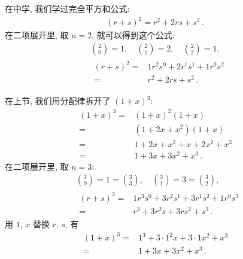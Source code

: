 \begin{example}
    在中学, 我们学过完全平方和公式:
    \begin{align*}
        (r + s)^2 = r^2 + 2rs + s^2 \period
    \end{align*}
    在二项展开里, 取 $n = 2$, 就可以得到这个公式:
    \begin{align*}
         & \binom{2}{0} = 1, \quad \binom{2}{1} = 2, \quad \binom{2}{2} = 1, \\
         & \begin{aligned}
            (r + s)^2
            = {} & 1r^2 s^0 + 2r^1 s^1 + 1r^0 s^2 \\
            = {} & r^2 + 2rs + s^2 \period
        \end{aligned}
    \end{align*}

    在上节, 我们用分配律拆开了 $(1+x)^3$:
    \begin{align*}
        (1+x)^3
        = {} & (1+x)^2 (1+x)         \\
        = {} & (1+2x+x^2) (1+x)      \\
        = {} & 1+2x+x^2 + x+2x^2+x^3 \\
        = {} & 1+3x+3x^2+x^3 \period
    \end{align*}
    在二项展开里, 取 $n = 3$:
    \begin{align*}
         & \binom{3}{0} = 1 = \binom{3}{3}, \quad \binom{3}{1} = 3 = \binom{3}{2}, \\
         & \begin{aligned}
            (r+s)^3
            = {} & 1r^3 s^0 + 3r^2 s^1 + 3r^1 s^2 + 1r^0 s^3 \\
            = {} & r^3 + 3r^2 s + 3r s^2 + s^3 \period
        \end{aligned}
    \end{align*}
    用 $1$, $x$ 替换 $r$, $s$, 有
    \begin{align*}
        (1+x)^3
        = {} & 1^3 + 3 \cdot 1^2 x + 3 \cdot 1 x^2 + x^3 \\
        = {} & 1 + 3x + 3x^2 + x^3 \period
    \end{align*}
\end{example}
